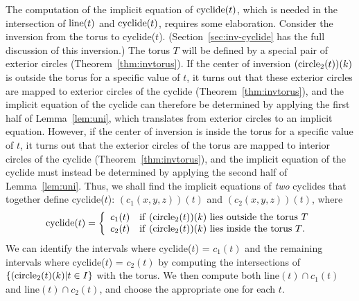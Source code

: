 The computation of the implicit equation of ${\rm cyclide}(t)$,
which is needed in the intersection of ${\rm line}(t)$ and ${\rm cyclide}(t)$,
requires some elaboration.
Consider the inversion from the torus to cyclide($t$).
(Section~\ref{sec:inv-cyclide} has the full discussion of this inversion.)
The torus $T$ will be defined by a special pair of exterior circles 
(Theorem~\ref{thm:invtorus}).
If the center of inversion $({\rm circle}_2(t))(k)$ is outside the torus
for a specific value of $t$, it turns out that these exterior circles 
are mapped to exterior
circles of the cyclide (Theorem~\ref{thm:invtorus}),
and the implicit equation of the cyclide can therefore be determined 
by applying the first half of Lemma~\ref{lem:uni},
which translates from exterior circles to an implicit equation.
However, 
if the center of inversion is inside the torus
for a specific value of $t$, it turns out that the exterior circles 
of the torus are mapped to interior circles of the cyclide
(Theorem~\ref{thm:invtorus}),
and the implicit equation of the cyclide must instead be determined 
by applying the second half of Lemma~\ref{lem:uni}.
Thus, we shall find the implicit equations of {\em two}
cyclides that together define cyclide($t$):
$(c_1(x,y,z))(t)$ and $(c_2(x,y,z))(t)$, where
\[ {\rm cyclide}(t) = \left\{ \begin{array}{ll}
	c_1(t) & {\rm if\ } ({\rm circle}_2(t))(k) 
		\mbox{ lies outside the torus $T$} \\
	c_2(t) & {\rm if\ } ({\rm circle}_2(t))(k) 
		\mbox{ lies inside the torus $T$}.
   \end{array} \right. 
\]
We can identify the intervals where cyclide($t$) = $c_1(t)$
and the remaining intervals where cyclide($t$) = $c_2(t)$
by computing the intersections
of $\{({\rm circle}_2(t)(k) | \mbox{$t \in I$}\}$ with the torus.
We then compute both $\mbox{line}(t) \cap c_1(t)$ and 
$\mbox{line}(t) \cap c_2(t)$, and choose the appropriate one for each $t$.


